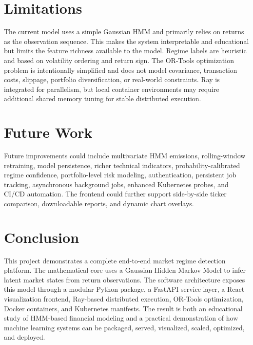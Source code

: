 \documentclass[conference]{IEEEtran}
\begin{document}
\section{Limitations}
The current model uses a simple Gaussian HMM and primarily relies on returns as the observation sequence. This makes the system interpretable and educational but limits the feature richness available to the model. Regime labels are heuristic and based on volatility ordering and return sign. The OR-Tools optimization problem is intentionally simplified and does not model covariance, transaction costs, slippage, portfolio diversification, or real-world constraints. Ray is integrated for parallelism, but local container environments may require additional shared memory tuning for stable distributed execution.

\section{Future Work}
Future improvements could include multivariate HMM emissions, rolling-window retraining, model persistence, richer technical indicators, probability-calibrated regime confidence, portfolio-level risk modeling, authentication, persistent job tracking, asynchronous background jobs, enhanced Kubernetes probes, and CI/CD automation. The frontend could further support side-by-side ticker comparison, downloadable reports, and dynamic chart overlays.

\section{Conclusion}
This project demonstrates a complete end-to-end market regime detection platform. The mathematical core uses a Gaussian Hidden Markov Model to infer latent market states from return observations. The software architecture exposes this model through a modular Python package, a FastAPI service layer, a React visualization frontend, Ray-based distributed execution, OR-Tools optimization, Docker containers, and Kubernetes manifests. The result is both an educational study of HMM-based financial modeling and a practical demonstration of how machine learning systems can be packaged, served, visualized, scaled, optimized, and deployed.
\end{document}
